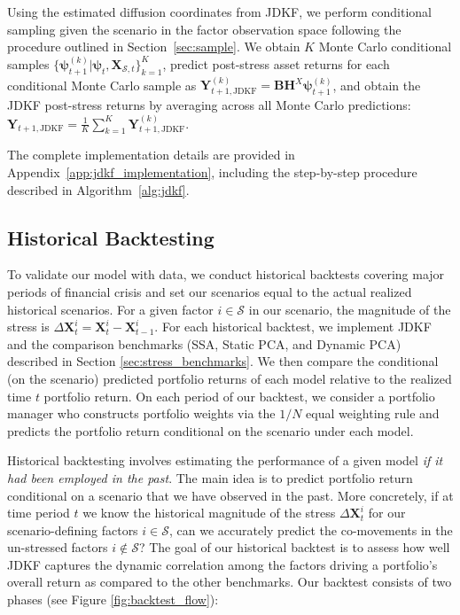 \documentclass[11pt]{article}
\theoremstyle{plain}
\theoremstyle{definition}
\theoremstyle{remark}
\numberwithin{equation}{section}
\begin{document}
Using the estimated diffusion coordinates from JDKF, we perform conditional sampling given the scenario in the factor observation space following the procedure outlined in Section~\ref{sec:sample}. We obtain $K$ Monte Carlo conditional samples $\{\boldsymbol{\psi}^{(k)}_{t+1} | \boldsymbol{\psi}_t, \mathbf{X}_{\mathcal{S},t}\}_{k=1}^K$, predict post-stress asset returns for each conditional Monte Carlo sample as $\mathbf{Y}^{(k)}_{t+1,\text{JDKF}} = \mathbf{B}\mathbf{H}^X\boldsymbol{\psi}^{(k)}_{t+1}$, and obtain the JDKF post-stress returns by averaging across all Monte Carlo predictions: $\mathbf{Y}_{t+1,\text{JDKF}} = \frac{1}{K}\sum_{k=1}^K \mathbf{Y}^{(k)}_{t+1,\text{JDKF}}$.

The complete implementation details are provided in Appendix~\ref{app:jdkf_implementation},  including the step-by-step procedure described in Algorithm~\ref{alg:jdkf}. 

\subsection{Historical Backtesting}
\label{sec:backtest}

To validate our model with data, we conduct historical backtests covering major periods of financial crisis and set our scenarios equal to the actual realized historical scenarios. For a given factor $i \in \mathcal{S}$ in our scenario, the magnitude of the stress is $\Delta \mathbf{X}_{t}^i=\mathbf{X}_{t}^i-\mathbf{X}_{t-1}^i$. For each historical backtest, we implement JDKF and the comparison benchmarks (SSA, Static PCA, and Dynamic PCA) described in Section \ref{sec:stress_benchmarks}. We then compare the conditional (on the scenario) predicted portfolio returns of each model relative to the realized time $t$ portfolio return. On each period of our backtest, we consider a portfolio manager who constructs portfolio weights via the $1/N$ equal weighting rule and predicts the portfolio return conditional on the scenario under each model.

Historical backtesting involves estimating the performance of a given model \textit{if it had been employed in the past}. The main idea is to predict portfolio return conditional on a scenario that we have observed in the past. More concretely, if at time period $t$ we know the historical magnitude of the stress $\Delta \mathbf{X}_{t}^i$ for our scenario-defining factors $i \in \mathcal{S}$, can we accurately predict the co-movements in the un-stressed factors $i \not \in \mathcal{S}$? The goal of our historical backtest is to assess how well JDKF captures the dynamic correlation among the factors driving a portfolio's overall return as compared to the other benchmarks. Our backtest consists of two phases (see Figure \ref{fig:backtest_flow}):
\end{document}

